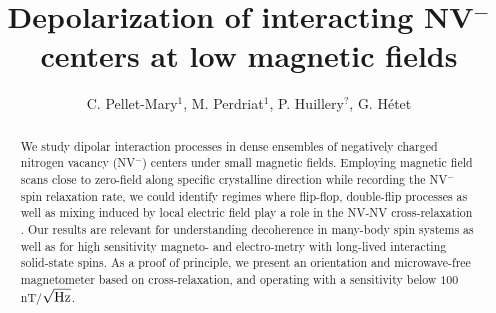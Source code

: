 \documentclass[preprintnumbers,amsmath,amssymb,superscriptaddress,twocolumn,showpacs]{revtex4-2}
\begin{document}
\title{Depolarization of interacting NV$^-$ centers at low magnetic fields}

\author{C. Pellet-Mary$^1$, M. Perdriat$^1$, P. Huillery$^?$,  G. H\'etet} 


\begin{abstract}
We study dipolar interaction processes in dense ensembles of negatively charged nitrogen vacancy (NV$^-$) centers under small magnetic fields. Employing magnetic field scans close to zero-field along specific crystalline direction while recording the NV$^-$ spin relaxation rate, we could identify regimes where flip-flop, double-flip processes as well as mixing induced by local electric field play a role in the NV-NV cross-relaxation .
Our results are relevant for understanding decoherence in many-body spin systems as well as for high sensitivity magneto- and electro-metry with long-lived interacting solid-state spins. As a proof of principle, we present an orientation and microwave-free magnetometer based on cross-relaxation, and operating with a sensitivity below $100$ nT/$\sqrt{\rm Hz}$.
\end{abstract}

\maketitle

\end{document}
